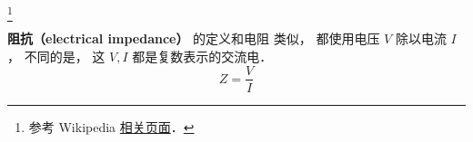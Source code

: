 
\begin{issues}
\issueDraft
\end{issues}


\footnote{参考 Wikipedia \href{https://en.wikipedia.org/wiki/Electrical_impedance}{相关页面}．}

\textbf{阻抗（electrical impedance）} 的定义和电阻 类似， 都使用电压 $V$ 除以电流 $I$， 不同的是， 这 $V, I$ 都是复数表示的交流电．
\begin{equation}
Z = \frac{V}{I}
\end{equation}
